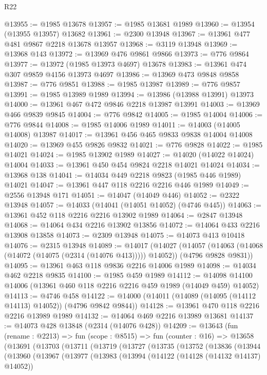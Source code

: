 \begin{lexlean}{R22}
\begin{coremodule}
@13955 := @1985 @13678
@13957 := @1985 @13681 @1989
@13960 := @13954 (@13955 @13957) @13682
@13961 := @2300 @13948
@13967 := @13961 @477 @481 @9867 @2218 @13678 @13957
@13968 := @3119 @13948
@13969 := @13968 @143
@13972 := @13969 @476 @9861 @9866
@13973 := @776 @9864
@13977 := @13972 (@1985 @13973 @4697) @13678
@13983 := @13961 @474 @307 @9859 @4156 @13973 @4697
@13986 := @13969 @473 @9848 @9858
@13987 := @776 @9851
@13988 := @1985 @13987
@13989 := @776 @9857
@13991 := @1985 @13989 @1989
@13994 := @13986 (@13988 @13991) @13973
@14000 := @13961 @467 @472 @9846 @2218 @13987 @13991
@14003 := @13969 @466 @9839 @9845
@14004 := @776 @9842
@14005 := @1985 @14004
@14006 := @776 @9844
@14008 := @1985 @14006 @1989
@14011 := @14003 (@14005 @14008) @13987
@14017 := @13961 @456 @465 @9833 @9838 @14004 @14008
@14020 := @13969 @455 @9826 @9832
@14021 := @776 @9828
@14022 := @1985 @14021
@14024 := @1985 @13902 @1989
@14027 := @14020 (@14022 @14024) @14004
@14033 := @13961 @450 @454 @9824 @2218 @14021 @14024
@14034 := @13968 @138
@14041 := @14034 @449 @2218 @9823 (@1985 @446 @1989) @14021
@14047 := @13961 @447 @118 @2216 @2216 @446 @1989
@14049 := @2556 @13948 @171
@14051 := @14047 (@14049 @446)
@14052 := @2322 @13948
@14057 := @14033 (@14041 (@14051 @14052) (@4746 @445))
@14063 := @13961 @452 @118 @2216 @2216 @13902 @1989
@14064 := @2847 @13948
@14068 := @14064 @434 @2216 @13902 @13856
@14072 := @14064 @433 @2216 @13908 @13858
@14073 := @2309 @13948
@14075 := @14073 @413 @10418
@14076 := @2315 @13948
@14089 := @14017
    (@14027
      (@14057 (@14063 (@14068 (@14072 (@14075 (@2314 (@14076 @413))))) @14052))
      (@4796 @9828 @9831))
@14095 := @13961 @463 @118 @9836 @2216 @14006 @1989
@14098 := @14034 @462 @2218 @9835
@14100 := @1985 @459 @1989
@14112 := @14098 @14100 @14006 (@13961 @460 @118 @2216 @2216 @459 @1989 (@14049 @459) @14052)
@14113 := @4746 @458
@14122 := @14000 (@14011 (@14089 (@14095 (@14112 @14113) @14052)) (@4796 @9842 @9844))
@14128 := @13961 @470 @118 @2216 @2216 @13989 @1989
@14132 := @14064 @469 @2216 @13989 @13681
@14137 := @14073 @428 @13848 (@2314 (@14076 @428))
@14209 := @13643
    (fun (rename : @2213) =>
    fun (scope : @8515) =>
    fun (counter : @16) =>
    @13658
      (@13691
        (@13703
          (@13711
            (@13719
              (@13727
                (@13735
                  (@13752
                    (@13836
                      (@13944
                        (@13960
                          (@13967
                            (@13977
                              (@13983
                                (@13994
                                  (@14122 (@14128 (@14132 @14137) @14052))

\end{coremodule}
\end{lexlean}
